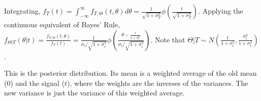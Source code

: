 \documentclass[12pt,english]{article}
\begin{document}
Integrating, $f_{T}(t) = \int_{-\infty}^{\infty} f_{T, \Theta}(t, \theta) d\theta = \frac{1}{\sqrt{1 + \sigma_{T}^{2}}} \phi\left(\frac{t}{\sqrt{1 + \sigma_{T}^{2}}}\right)$. Applying the continuous equivalent of Bayes' Rule, $f_{\Theta | T}(\theta | t) = \frac{f_{T, \Theta}(t, \theta)}{f_{T}(t)} = \frac{1}{\sigma_{t} / \sqrt{1 + \sigma_{t}^{2}}} \phi \left( \frac{\theta - \frac{t}{1 + \sigma_{t}^{2}}}{\sigma_{t} / \sqrt{1 + \sigma_{t}^{2}}} \right)$. Note that $\Theta | T \sim N\left(\frac{t}{1 + \sigma_{t}^{2}}, \frac{\sigma_{t}^{2}}{1 + \sigma_{t}^{2}}\right)$.

This is the posterior distribution. Its mean is a weighted average of the old mean (0) and the signal ($t$), where the weights are the inverses of the variances. The new variance is just the variance of this weighted average.
\end{document}
